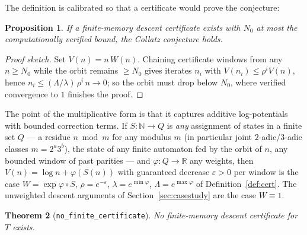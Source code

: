 \documentclass[11pt]{article}
\newtheorem{theorem}{Theorem}[section]
\newtheorem{proposition}[theorem]{Proposition}
\newcommand{\N}{\mathbb{N}}
\newcommand{\code}[1]{\texttt{#1}}
\begin{document}
The definition is calibrated so that a certificate would prove the
conjecture:

\begin{proposition}\label{prop:motivation}
If a finite-memory descent certificate exists with $N_0$ at most the
computationally verified bound, the Collatz conjecture holds.
\end{proposition}

\begin{proof}[Proof sketch]
Set $V(n) = n\,W(n)$. Chaining certificate windows from any $n \ge N_0$
while the orbit remains $\ge N_0$ gives iterates $n_i$ with $V(n_i) \le
\rho^i V(n)$, hence $n_i \le (\Lambda/\lambda)\, \rho^i\, n \to 0$; so
the orbit must drop below $N_0$, where verified convergence to $1$
finishes the proof.
\end{proof}

The point of the multiplicative form is that it captures additive
log-potentials with bounded correction terms. If $S \colon \N \to Q$ is
\emph{any} assignment of states in a finite set $Q$ --- a residue
$n \bmod m$ for any modulus $m$ (in particular joint $2$-adic/$3$-adic
classes $m = 2^a 3^b$), the state of any finite automaton fed by the
orbit of $n$, any bounded window of past parities --- and
$\varphi \colon Q \to \mathbb{R}$ any weights, then
$V(n) = \log n + \varphi(S(n))$ with guaranteed decrease $\varepsilon >
0$ per window is the case $W = \exp \varphi \circ S$, $\rho =
e^{-\varepsilon}$, $\lambda = e^{\min \varphi}$, $\Lambda = e^{\max
\varphi}$ of Definition~\ref{def:cert}. The unweighted descent
arguments of Section~\ref{sec:casestudy} are the case $W \equiv 1$.

\begin{theorem}[\code{no\_finite\_certificate}]\label{thm:nogo}
No finite-memory descent certificate for $T$ exists.
\end{theorem}
\end{document}
